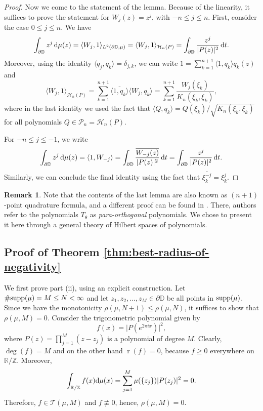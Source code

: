 \documentclass[reqno, a4paper]{amsart}
\def\T{\mathbb{R}/\mathbb{Z}}
\def\P{\mathcal{P}}
\def\supp{{\rm supp}}
\renewcommand{\d}{\text{\rm d}}
\newcommand{\dD}{\partial\mathbb{D}}
\renewcommand{\r}{\operatorname{r}}
\theoremstyle{plain}
\theoremstyle{definition}
\theoremstyle{remarkstyle}
\newtheorem*{remark}{Remark}
\numberwithin{equation}{section}
\begin{document}
\begin{proof}
Now we come to the statement of the lemma. Because of the linearity, it suffices to prove the statement for $W_j(z)=z^j$, with $-n\leq j\leq n$.  First, consider the case $0\leq j\leq n$. We have 
\begin{equation*}
    \int_{\dD} z^j\, \d\mu(z)=\langle W_j, 1\rangle_{L^2(\dD, \mu)}=\langle W_j, 1\rangle_{\mathcal{H}_n(P)}=\int_{\dD}\frac{z^j}{|P(z)|^2}\, \d t.
\end{equation*}
Moreover, using the identity $\langle q_j, q_k\rangle=\delta_{j,k}$, we can write $1=\sum_{k=1}^{n+1} \langle 1, q_k\rangle q_k(z)$ and 
\begin{equation*}
    \langle W_j, 1\rangle_{\mathcal{H}_n(P)}=\sum_{k=1}^{n+1}\overline{\langle 1, q_k\rangle}\langle W_j, q_k\rangle=\sum_{k=1}^{n+1}\frac{W_j(\xi_k)}{K_n(\xi_k, \xi_k)},
\end{equation*}
where in the last identity we used the fact that $\langle Q, q_k\rangle=Q(\xi_k)/\sqrt{K_n(\xi_k, \xi_k)}$ for all polynomials $Q\in \P_n=\mathcal{H}_n(P)$.

For $-n\leq j\leq -1$, we write
\begin{equation*}
    \int_{\dD} z^j\, \d\mu(z)=\langle 1, W_{-j}\rangle=\int_{\dD} \frac{\overline{W_{-j}(z)}}{|P(z)|^2}\,\d t=\int_{\dD}\frac{z^j}{|P(z)|^2}\,\d t.
\end{equation*}
Similarly, we can conclude the final identity using the fact that $\overline{\xi_k^{-j}}=\xi_k^{j}$. 
\end{proof}

\begin{remark}
    Note that the contents of the last lemma are also known as $(n+1)$-point quadrature formula, and a different proof can be found in \cite[see $\mathsection 6$ and $\mathsection 7$]{JonesNjastadThronMomentTheoryOnUnitCircle}. There, authors refer to the polynomials $T_\theta$ as \emph{para-orthogonal} polynomials. We chose to present it here through a general theory of Hilbert spaces of polynomials.
\end{remark}

\subsection{Proof of Theorem \ref{thm:best-radius-of-negativity}}
We first prove part (ii), using an explicit construction. Let $\#\supp(\mu)=M\leq N<\infty$ and  let $z_1, z_2, \ldots, z_M\in\dD$ be all points in $\supp(\mu)$. Since we have the monotonicity $\rho(\mu, N+1)\leq \rho(\mu,N)$, it suffices to show that $\rho(\mu, M)=0$.
Consider the trigonometric polynomial given by 
\begin{equation*}
    f(x)=\lvert P(e^{2\pi i x})\rvert^2,
\end{equation*}
where $P(z)=\prod_{j=1}^{M} (z-z_j)$ is a polynomial of degree $M$. Clearly, $\deg(f)=M$ and on the other hand $\r(f)=0$, because $f\geq 0$ everywhere on $\T$. Moreover, 
\begin{equation*}
\int_{\T} f(x)\d\mu(x)=\sum_{j=1}^{M} \mu(\{z_j\}) \lvert P(z_j)\rvert^2=0.    
\end{equation*}
Therefore, $f\in \mathcal{T}(\mu, M)$ and $f\not\equiv 0$, hence, $\rho(\mu, M)=0$. 
\end{document}
